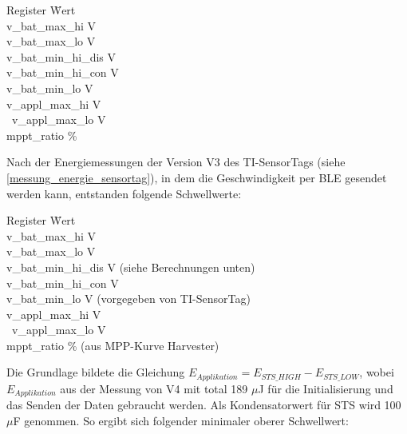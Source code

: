 \begin{minipage}{\textwidth}
    \begin{tabbing}
    Register \hspace{4cm} \quad\= Wert \\[0.8ex]
    v\_bat\_max\_hi        V \\
    v\_bat\_max\_lo        V \\
    v\_bat\_min\_hi\_dis   V \\
    v\_bat\_min\_hi\_con   V \\
    v\_bat\_min\_lo        V \\
    v\_appl\_max\_hi       V \\\
    v\_appl\_max\_lo       V \\ 
    mppt\_ratio            \thinspace\% \\
    \end{tabbing}
\end{minipage}

Nach der Energiemessungen der Version V3 des TI-SensorTags (siehe \ref{messung_energie_sensortag}), in dem die Geschwindigkeit per BLE gesendet werden kann, entstanden folgende Schwellwerte:

\begin{minipage}{\textwidth}
    \begin{tabbing}
    Register\hspace{4cm} \quad\= Wert \\[0.8ex]
    v\_bat\_max\_hi        V \\
    v\_bat\_max\_lo        V \\
    v\_bat\_min\_hi\_dis   V (siehe Berechnungen unten)\\
    v\_bat\_min\_hi\_con   V \\
    v\_bat\_min\_lo        V (vorgegeben von TI-SensorTag)\\
    v\_appl\_max\_hi      \> 3.8 V \\\
    v\_appl\_max\_lo       V \\ 
    mppt\_ratio            \> 50\thinspace\% (aus MPP-Kurve Harvester)\\
    \end{tabbing}
\end{minipage}

Die Grundlage bildete die Gleichung  $E_{Applikation}= E_{STS\_HIGH} - E_{STS\_LOW}$, wobei  $E_{Applikation}$ aus der Messung von V4 mit total 189 $\mu$J für die Initialisierung und das Senden der Daten gebraucht werden. Als Kondensatorwert für STS wird 100 $\mu$F genommen. So ergibt sich folgender minimaler oberer Schwellwert:

